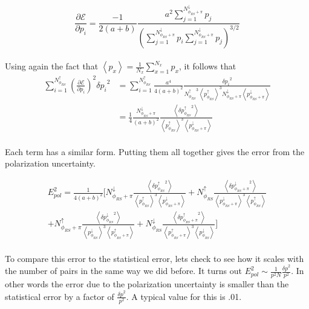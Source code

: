 \documentclass[abstract = on,listof=totoc, bibliography=totoc]{scrreprt}
\newcommand{\phirs}{\phi_{RS}}
\begin{document}
\begin{equation}
\label{eq:singleDeriv}
\frac{\partial\mathcal{E}}{\partial p_i} = \frac{-1}{2(a+b)} \frac{a^2 \sum\limits_{j=1}^{N^\downarrow_{\phirs+\pi}}p_j}{\left(\sum\limits_{j=1}^{N^\downarrow_{\phirs+\pi}}p_i \sum\limits_{j=1}^{N^\downarrow_{\phirs+\pi}} p_j\right)^{3/2}}
\end{equation}\\
%
Using again the fact that $\left<p_x\right> = \frac{1}{N_x}\sum\limits_{x=1}^{N_x} p_x$, it follows that 
\begin{align}
\sum\limits_{i=1}^{N^\uparrow_{\phirs}} \left(\frac{\partial\mathcal{E}}{\partial p_i}\right)^2 {\delta p_i}^2 &= \sum\limits_{i=1}^{N^\uparrow_{\phirs}} \frac{a^4}{4(a+b)^2} \frac{{\delta p_i}^2}{{N^\uparrow_{\phirs}}^3\left<p^\uparrow_{\phirs}\right>^3N^\downarrow_{\phirs+\pi}\left<p^\downarrow_{\phirs+\pi}\right>} \\
& = \frac{1}{4} \frac{N^\downarrow_{\phirs+\pi}}{(a+b)^2} \frac{\left<{\delta p^\uparrow_{\phirs}}^2\right>}{\left<p^\uparrow_{\phirs}\right>^3\left<p^\downarrow_{\phirs+\pi}\right>}
\end{align}\\
%
Each term has a similar form. Putting them all together gives the error from the polarization uncertainty. 

\begin{align}
E_{pol}^2 = \frac{1}{4(a+b)^2} \Biggl[ N^\downarrow_{\phirs+\pi} \frac{\left<{\delta p^\uparrow_{\phirs}}^2\right>}{\left<p^\uparrow_{\phirs}\right>^3\left<p^\downarrow_{\phirs+\pi}\right>} + N^\uparrow_{\phirs} \frac{\left<{\delta p^\downarrow_{\phirs+\pi}}^2\right>}{\left<p^\downarrow_{\phirs+\pi}\right>^3\left<p^\uparrow_{\phirs}\right>} \\ \nonumber
+  N^\uparrow_{\phirs+\pi} \frac{\left<{\delta p^\downarrow_{\phirs}}^2\right>}{\left<p^\downarrow_{\phirs}\right>^3\left<p^\uparrow_{\phirs+\pi}\right>} + N^\downarrow_{\phirs} \frac{\left<{\delta p^\uparrow_{\phirs+\pi}}^2\right>}{\left<p^\uparrow_{\phirs+\pi}\right>^3\left<p^\downarrow_{\phirs}\right>} \Biggr]
\end{align}\\
%

To compare this error to the statistical error, lets check to see how it scales with the number of pairs in the same way we did before. It turns out $E_{pol}^2 \sim \frac{1}{p^2N} \frac{{\delta p}^2}{p^2}$. In other words the error due to the polarization uncertainty is smaller than the statistical error by a factor of $\frac{{\delta p}^2}{p^2}$. A typical value for this is .01.
\end{document}
